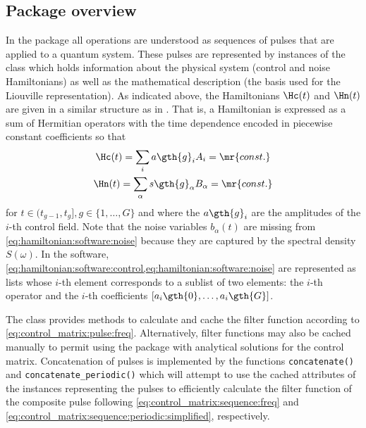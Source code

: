 \subsection{Package overview}\label{sec:software:overview}
In the \filterfunctions package all operations are understood as sequences of pulses that are applied to a quantum system. These pulses are represented by instances of the \pulsesequence class which holds information about the physical system (control and noise Hamiltonians) as well as the mathematical description (\eg the basis used for the Liouville representation). As indicated above, the Hamiltonians $\Hc(t)$ and $\Hn(t)$ are given in a similar structure as in \qutip. That is, a Hamiltonian is expressed as a sum of Hermitian operators with the time dependence encoded in piecewise constant coefficients so that
\begin{subequations}\label{eq:hamiltonian:software}
\begin{gather}
    \Hc(t) = \sum_i a\gth{g}_i A_i = \mr{const.} \label{eq:hamiltonian:software:control} \\
    \Hn(t) = \sum_\alpha s\gth{g}_\alpha B_\alpha = \mr{const.} \label{eq:hamiltonian:software:noise}
\end{gather}
\end{subequations}
for $t\in (t_{g-1}, t_g], g\in\lbrace 1,\dotsc,G\rbrace$ and where the $a\gth{g}_i$ are the amplitudes of the $i$-th control field. Note that the noise variables $b_\alpha(t)$ are missing from \cref{eq:hamiltonian:software:noise} because they are captured by the spectral density $S(\omega)$. In the software, \cref{eq:hamiltonian:software:control,eq:hamiltonian:software:noise} are represented as lists whose $i$-th element corresponds to a sublist of two elements: the $i$-th operator and the $i$-th coefficients $[a_i\gth{0},\dotsc,a_i\gth{G}]$.

The \pulsesequence class provides methods to calculate and cache the filter function according to \cref{eq:control_matrix:pulse:freq}. Alternatively, filter functions may also be cached manually to permit using the package with analytical solutions for the control matrix. Concatenation of pulses is implemented by the functions \verb|concatenate()| and \verb|concatenate_periodic()| which will attempt to use the cached attributes of the \pulsesequence instances representing the pulses to efficiently calculate the filter function of the composite pulse following \cref{eq:control_matrix:sequence:freq} and \cref{eq:control_matrix:sequence:periodic:simplified}, respectively.

